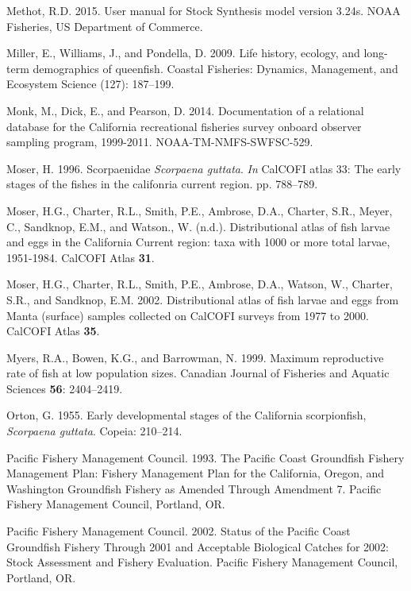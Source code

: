 \documentclass[12pt,]{article}
\begin{document}
\hypertarget{ref-Methot2015}{}
Methot, R.D. 2015. User manual for Stock Synthesis model version 3.24s.
NOAA Fisheries, US Department of Commerce.

\hypertarget{ref-Miller2009}{}
Miller, E., Williams, J., and Pondella, D. 2009. Life history, ecology,
and long-term demographics of queenfish. Coastal Fisheries: Dynamics,
Management, and Ecosystem Science (127): 187--199.

\hypertarget{ref-Monk2014}{}
Monk, M., Dick, E., and Pearson, D. 2014. Documentation of a relational
database for the California recreational fisheries survey onboard
observer sampling program, 1999-2011. NOAA-TM-NMFS-SWFSC-529.

\hypertarget{ref-Moser1996}{}
Moser, H. 1996. Scorpaenidae \emph{Scorpaena guttata}. \emph{In} CalCOFI
atlas 33: The early stages of the fishes in the califonria current
region. pp. 788--789.

\hypertarget{ref-Moser1993}{}
Moser, H.G., Charter, R.L., Smith, P.E., Ambrose, D.A., Charter, S.R.,
Meyer, C., Sandknop, E.M., and Watson., W. (n.d.). Distributional atlas
of fish larvae and eggs in the California Current region: taxa with 1000
or more total larvae, 1951-1984. CalCOFI Atlas \textbf{31}.

\hypertarget{ref-Moser2002}{}
Moser, H.G., Charter, R.L., Smith, P.E., Ambrose, D.A., Watson, W.,
Charter, S.R., and Sandknop, E.M. 2002. Distributional atlas of fish
larvae and eggs from Manta (surface) samples collected on CalCOFI
surveys from 1977 to 2000. CalCOFI Atlas \textbf{35}.

\hypertarget{ref-Myers1999}{}
Myers, R.A., Bowen, K.G., and Barrowman, N. 1999. Maximum reproductive
rate of fish at low population sizes. Canadian Journal of Fisheries and
Aquatic Sciences \textbf{56}: 2404--2419.

\hypertarget{ref-Orton1955}{}
Orton, G. 1955. Early developmental stages of the California
scorpionfish, \emph{Scorpaena guttata}. Copeia: 210--214.

\hypertarget{ref-PFMC1993}{}
Pacific Fishery Management Council. 1993. The Pacific Coast Groundfish
Fishery Management Plan: Fishery Management Plan for the California,
Oregon, and Washington Groundfish Fishery as Amended Through Amendment
7. Pacific Fishery Management Council, Portland, OR.

\hypertarget{ref-PFMC2002}{}
Pacific Fishery Management Council. 2002. Status of the Pacific Coast
Groundfish Fishery Through 2001 and Acceptable Biological Catches for
2002: Stock Assessment and Fishery Evaluation. Pacific Fishery
Management Council, Portland, OR.
\end{document}
